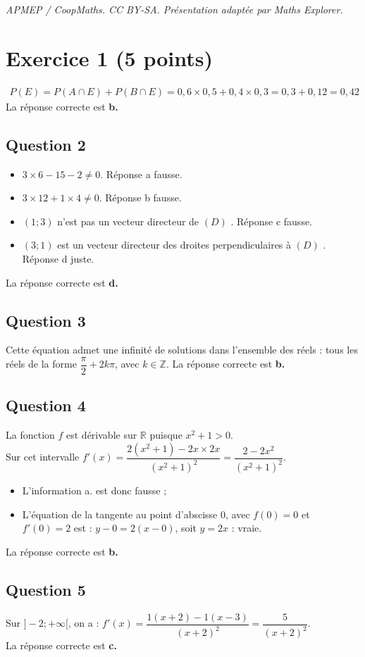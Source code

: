 \documentclass[10pt]{article}
\begin{document}
\noindent\textit{APMEP / CoopMaths. CC BY-SA. Présentation adaptée par Maths Explorer.}\par\medskip
\section*{Exercice 1 (5 points)}
	
\[
	\begin{array}{l}
		P(E) = P(A \cap E) + P(B \cap E) = 0,6 \times 0,5 + 0,4 \times 0,3 = 0,3 + 0,12 = 0,42
	\end{array}
	\]
La réponse correcte est \textbf{b.}
	
	\subsection*{Question 2}

	\begin{itemize}
		\item $3 \times 6 - 15 - 2 \neq 0.$ Réponse a fausse.
		\item	$3 \times 12 + 1 \times 4 \neq 0$. Réponse b fausse.
			\item $(1; 3)$  n’est pas un vecteur directeur de $(D)$ . Réponse c fausse.
			\item $(3; 1)$ est un vecteur directeur des droites perpendiculaires à  $(D)$ . Réponse d juste.
	\end{itemize}
La réponse correcte est \textbf{d.}
	
	\subsection*{Question 3}
Cette équation admet une infinité de solutions dans l’ensemble des réels : tous les réels de la forme $\dfrac{\pi}{2} + 2k\pi$, avec $k \in \mathbb{Z}$. La réponse correcte est \textbf{b.}
	
	\subsection*{Question 4}
La fonction $f$ est dérivable sur $\mathbb{R}$ puisque $x^2 + 1 > 0$.\\
Sur cet intervalle $f'(x) = \dfrac{2(x^2 + 1) - 2x \times 2x}{(x^2 + 1)^2} = \dfrac{2 - 2x^2}{(x^2 + 1)^2}$.
	
	\begin{itemize}
		\item L’information a. est donc fausse ;
		\item L’équation de la tangente au point d’abscisse 0, avec $f(0) = 0$ et $f'(0) = 2$ est : $y - 0 = 2(x - 0)$, soit $y = 2x$ : vraie.
	\end{itemize}
La réponse correcte est \textbf{b.}
	
	\subsection*{Question 5}
	
Sur $]-2; +\infty[$, on a : $f'(x) = \dfrac{1(x + 2) - 1(x - 3)}{(x + 2)^2} = \dfrac{5}{(x + 2)^2}$.\\
La réponse correcte est \textbf{c.}
\end{document}
